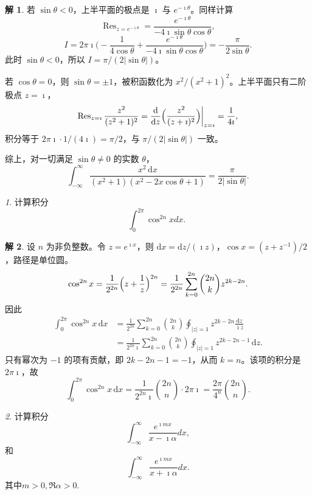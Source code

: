 \documentclass[11pt]{article}
\newcommand{\Res}{\operatorname{Res}}
\theoremstyle{remark}
\newtheorem{problem}{}
\theoremstyle{definition}
\newtheorem{solution}{解}
\begin{document}
\begin{solution}
若 $\sin\theta<0$，上半平面的极点是 $\imath$ 与 $e^{-\imath\theta}$。同样计算
\[
\Res_{z=e^{-\imath\theta}}
=\frac{e^{-\imath\theta}}{-4\imath\sin\theta\cos\theta},
\]
\[
I
=2\pi\imath\Biggl(
-\frac{1}{4\cos\theta}
+\frac{e^{-\imath\theta}}{-4\imath\sin\theta\cos\theta}
\Biggr)
=-\frac{\pi}{2\sin\theta}.
\]
此时 $\sin\theta<0$，所以 $I=\pi/(2|\sin\theta|)$。

若 $\cos\theta=0$，则 $\sin\theta=\pm 1$，被积函数化为 $x^{2}/(x^{2}+1)^{2}$。上半平面只有二阶极点 $z=\imath$，
\[
\Res_{z=\imath}\frac{z^{2}}{(z^{2}+1)^{2}}
=\frac{\mathrm{d}}{\mathrm{d}z}\Bigl(\frac{z^{2}}{(z+\imath)^{2}}\Bigr)\bigg|_{z=\imath}
=\frac{1}{4\imath},
\]
积分等于 $2\pi\imath\cdot 1/(4\imath)=\pi/2$，与 $\pi/(2|\sin\theta|)$ 一致。

综上，对一切满足 $\sin\theta\neq 0$ 的实数 $\theta$，
\[
\int_{-\infty}^{\infty}
\frac{x^{2}\,\mathrm{d}x}{(x^{2}+1)(x^{2}-2x\cos\theta+1)}
=\frac{\pi}{2|\sin\theta|}.
\]
\end{solution}

\begin{problem}
  计算积分
  $$
  \int_0^{2 \pi} \cos ^{2 n} x d x \text {. }
  $$
\end{problem}

\begin{solution}
设 $n$ 为非负整数。令 $z=e^{\imath x}$，则 $\mathrm{d}x=\mathrm{d}z/(\imath z)$，$\cos x=(z+z^{-1})/2$，路径是单位圆。
\[
\cos^{2n}x
=\frac{1}{2^{2n}}\Bigl(z+\frac{1}{z}\Bigr)^{2n}
=\frac{1}{2^{2n}}\sum_{k=0}^{2n}\binom{2n}{k}z^{2k-2n}.
\]
因此
\begin{align*}
\int_{0}^{2\pi}\cos^{2n}x\,\mathrm{d}x
&=\frac{1}{2^{2n}}\sum_{k=0}^{2n}\binom{2n}{k}
\oint_{|z|=1}z^{2k-2n}\frac{\mathrm{d}z}{\imath z}\\
&=\frac{1}{2^{2n}\imath}\sum_{k=0}^{2n}\binom{2n}{k}
\oint_{|z|=1}z^{2k-2n-1}\,\mathrm{d}z.
\end{align*}
只有幂次为 $-1$ 的项有贡献，即 $2k-2n-1=-1$，从而 $k=n$。该项的积分是 $2\pi\imath$，故
\[
\int_{0}^{2\pi}\cos^{2n}x\,\mathrm{d}x
=\frac{1}{2^{2n}\imath}\binom{2n}{n}\cdot 2\pi\imath
=\frac{2\pi}{4^{n}}\binom{2n}{n}.
\]
\end{solution}

\begin{problem}
  计算积分
  $$
  \int_{-\infty}^{\infty} \frac{e^{\imath m x}}{x-\imath \alpha} d x,
  $$
  和
  $$
  \int_{-\infty}^{\infty} \frac{e^{\imath m x}}{x+\imath \alpha} d x.
  $$
  其中$m>0, \Re \alpha > 0$.
\end{problem}
\end{document}
